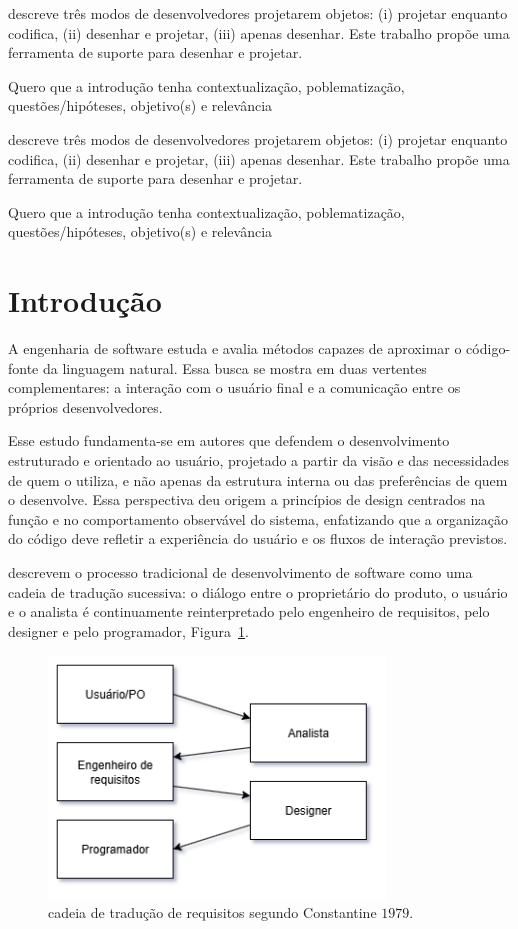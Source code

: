 \documentclass[12pt,a4paper]{article}
\begin{document}
\textcite{larman2002applying} descreve três modos de desenvolvedores projetarem objetos: (i) projetar enquanto codifica, (ii) desenhar e projetar, (iii) apenas desenhar. Este trabalho propõe uma ferramenta de suporte para desenhar e projetar. %

Quero que a introdução tenha contextualização, poblematização, questões/hipóteses, objetivo(s) e relevância

\textcite{larman2002applying} descreve três modos de desenvolvedores projetarem objetos: (i) projetar enquanto codifica, (ii) desenhar e projetar, (iii) apenas desenhar. Este trabalho propõe uma ferramenta de suporte para desenhar e projetar. %

Quero que a introdução tenha contextualização, poblematização, questões/hipóteses, objetivo(s) e relevância

\section{Introdução}

A engenharia de software estuda e avalia métodos capazes de aproximar o código-fonte da linguagem natural. Essa busca se mostra em duas vertentes complementares: a interação com o usuário final e a comunicação entre os próprios desenvolvedores. 

Esse estudo fundamenta-se em autores que defendem o desenvolvimento estruturado e orientado ao usuário, projetado a partir da visão e das necessidades de quem o utiliza, e não apenas da estrutura interna ou das preferências de quem o desenvolve. Essa perspectiva deu origem a princípios de design centrados na função e no comportamento observável do sistema, enfatizando que a organização do código deve refletir a experiência do usuário e os fluxos de interação previstos. 

\textcite{yourdon1979structured} descrevem o processo tradicional de desenvolvimento de software como uma cadeia de tradução sucessiva: o diálogo entre o proprietário do produto, o usuário e o analista é continuamente reinterpretado pelo engenheiro de requisitos, pelo designer e pelo programador, Figura~\ref{fig:cadeia_traducao}.

\begin{figure}
  \centering
  \includegraphics[width=0.8\textwidth]{Images/draw/fluxo_info.png}
  \caption{cadeia de tradução de requisitos segundo Constantine \(1979\).}
  \label{fig:cadeia_traducao}
\end{figure}
\end{document}
